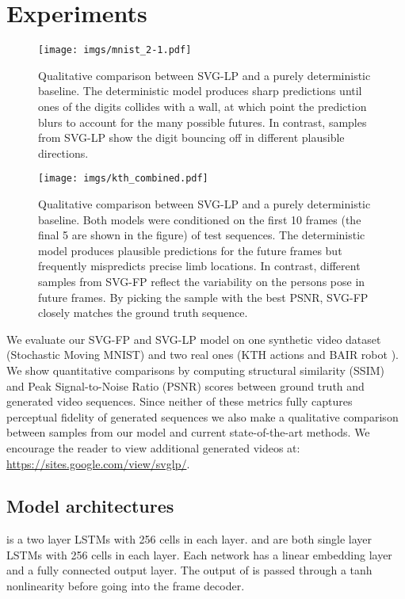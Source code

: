 \section{Experiments}
\label{experiments}

\begin{figure*}[t!]
\centering
     \texttt{[image: imgs/mnist\_2-1.pdf]}
 \caption{Qualitative comparison between SVG-LP and a
   purely deterministic baseline. The deterministic model
   produces sharp predictions until ones of the digits collides with a 
   wall, at which point the prediction blurs to account for the many
   possible futures. In contrast, samples from
   SVG-LP show the digit bouncing off in different plausible
   directions. 
} 
\label{fig:mnist_gen}
\end{figure*}

\begin{figure*}[t!]
\centering
     \texttt{[image: imgs/kth\_combined.pdf]}
\caption{Qualitative comparison between SVG-LP and a purely deterministic baseline. Both models were conditioned on the first 10 frames (the final 5 are shown in the figure) of test sequences. The deterministic model produces plausible predictions for the future frames but frequently mispredicts precise limb locations. In contrast, different samples from SVG-FP reflect the variability on the persons pose in future frames. By picking the sample with the best PSNR, SVG-FP closely matches the ground truth sequence. }
\label{fig:kth_gen}
\end{figure*}

We evaluate our SVG-FP and SVG-LP model on one synthetic video dataset
(Stochastic Moving MNIST) and two real ones (KTH actions \cite{kth} and
BAIR robot \cite{ebert17}).  We show quantitative comparisons by computing
structural similarity (SSIM) and Peak Signal-to-Noise Ratio (PSNR)
scores between ground truth and generated video sequences.  Since
neither of these metrics fully captures perceptual fidelity of
generated sequences we also make a qualitative comparison between
samples from our model and current state-of-the-art methods. 
We encourage the reader to view additional generated videos at: \url{https://sites.google.com/view/svglp/}.

\subsection{Model architectures}
 is a two layer LSTMs with 256 cells in each layer.  
 and  are both single layer LSTMs with 256 cells in each layer.  
Each network has a linear embedding
layer and a fully connected output layer.
The output of  is passed through a tanh nonlinearity before going into the frame decoder.


